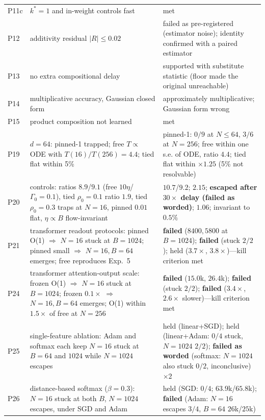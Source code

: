 \begin{center}
\begin{tabular}{lp{6.4cm}p{6.4cm}}
P11c & $k^*{=}1$ and in-weight controls fast & met \\
P12 & additivity residual $|R|\le0.02$ & failed as pre-registered (estimator noise); identity confirmed with a paired estimator \\
P13 & no extra compositional delay & supported with substitute statistic (floor made the original unreachable) \\
P14 & multiplicative accuracy, Gaussian closed form & approximately multiplicative; Gaussian form wrong \\
P15 & product composition not learned & met \\
P19 & $d{=}64$: pinned-1 trapped; free $T\propto$ ODE with $T(16)/T(256)=4.4$; tied flat within 5\% & pinned-1: $0/9$ at $N\le64$, $3/6$ at $N{=}256$; free within one s.e. of ODE, ratio $4.4$; tied flat within $\times1.25$ (5\% not resolvable) \\
P20 & controls: ratios $8.9$/$9.1$ (free $10\eta$/$\Gamma_0{=}0.1$), tied $\rho_0{=}0.1$ ratio $1.9$, tied $\rho_0{=}0.3$ traps at $N{=}16$, pinned $0.01$ flat, $\eta\propto B$ flow-invariant & $10.7$/$9.2$; $2.15$; \textbf{escaped after $30\times$ delay (failed as worded)}; $1.06$; invariant to $0.5\%$ \\
P21 & transformer readout protocols: pinned O(1) $\Rightarrow$ $N{=}16$ stuck at $B{=}1024$; pinned small $\Rightarrow$ $N{=}16,B{=}64$ emerges; free reproduces Exp.~5 & \textbf{failed} ($8400,5800$ at $B{=}1024$); \textbf{failed} (stuck $2/2$); held ($3.7\times$, $3.8\times$)---kill criterion met \\
P24 & transformer attention-output scale: frozen O(1) $\Rightarrow$ $N{=}16$ stuck at $B{=}1024$; frozen $0.1\times$ $\Rightarrow$ $N{=}16,B{=}64$ emerges; O(1) within $1.5\times$ of free at $N{=}256$ & \textbf{failed} ($15.0$k, $26.4$k); \textbf{failed} (stuck $2/2$); \textbf{failed} ($3.4\times$, $2.6\times$ slower)---kill criterion met \\
P25 & single-feature ablation: Adam and softmax each keep $N{=}16$ stuck at $B{=}64$ and $1024$ while $N{=}1024$ escapes & held (linear+SGD); held (linear+Adam: $0/4$ stuck, $N{=}1024$ $2/2$); \textbf{failed as worded} (softmax: $N{=}1024$ also stuck $0/2$, inconclusive) $\times2$ \\
P26 & distance-based softmax ($\beta{=}0.3$): $N{=}16$ stuck at both $B$, $N{=}1024$ escapes, under SGD and Adam & held (SGD: $0/4$; $63.9$k/$65.8$k); \textbf{failed} (Adam: $N{=}16$ escapes $3/4$, $B{=}64$ $26$k/$25$k) \\

\end{tabular}
\end{center}
